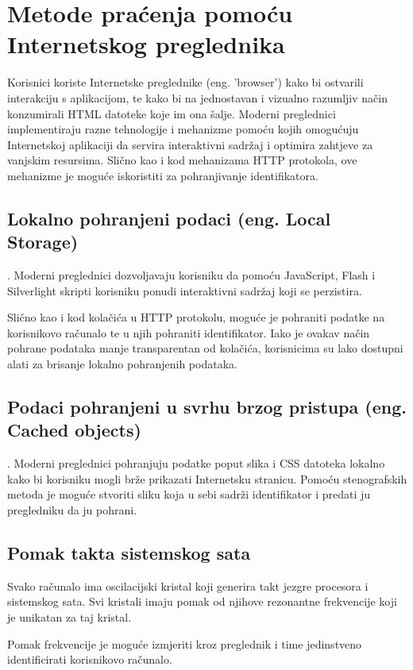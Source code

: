 \documentclass[times, utf8, zavrsni]{fer}
\begin{document}
\section{Metode praćenja pomoću Internetskog preglednika}
Korisnici koriste Internetske preglednike (eng. 'browser') kako bi ostvarili
interakciju s aplikacijom, te kako bi na jednostavan i vizualno razumljiv način
konzumirali HTML datoteke koje im ona šalje. Moderni preglednici implementiraju
razne tehnologije i mehanizme pomoću kojih omogućuju Internetskoj aplikaciji da
servira interaktivni sadržaj i optimira zahtjeve za vanjskim resursima. Slično
kao i kod mehanizama HTTP protokola, ove mehanizme je moguće iskoristiti za
pohranjivanje identifikatora.

\subsection{Lokalno pohranjeni podaci (eng. Local Storage)}. Moderni
preglednici dozvoljavaju korisniku da pomoću JavaScript, Flash i Silverlight
skripti korisniku ponudi interaktivni sadržaj koji se perzistira.

Slično kao i kod kolačića u HTTP protokolu, moguće je pohraniti podatke
na korisnikovo računalo te u njih pohraniti identifikator. Iako je ovakav
način pohrane podataka manje transparentan od kolačića, korisnicima su lako
dostupni alati za brisanje lokalno pohranjenih podataka.

\subsection{Podaci pohranjeni u svrhu brzog pristupa (eng. Cached objects)}.
Moderni preglednici pohranjuju podatke poput slika i CSS datoteka lokalno
kako bi korisniku mogli brže prikazati Internetsku stranicu. Pomoću
stenografskih metoda je moguće stvoriti sliku koja u sebi sadrži
identifikator i predati ju pregledniku da ju pohrani.

\subsection{Pomak takta sistemskog sata}
Svako računalo ima oscilacijski kristal koji generira takt jezgre procesora
i sistemskog sata. Svi kristali imaju pomak od njihove rezonantne
frekvencije koji je unikatan za taj kristal.

Pomak frekvencije je moguće izmjeriti kroz preglednik i time jedinstveno
identificirati korisnikovo računalo.
\end{document}
